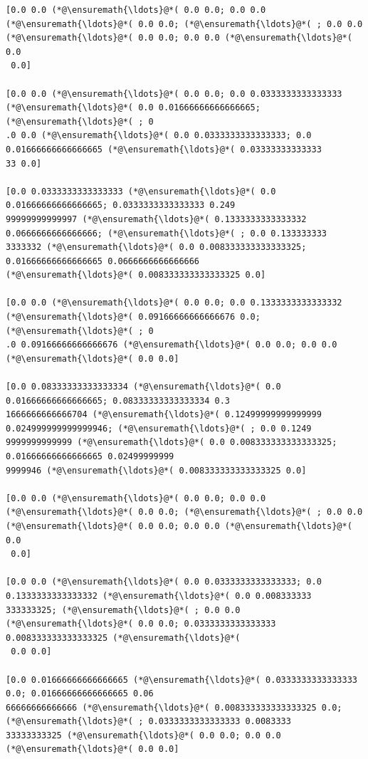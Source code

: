 \documentclass[12pt,a4paper]{article}
\begin{document}
\begin{lstlisting}
[0.0 0.0 (*@\ensuremath{\ldots}@*( 0.0 0.0; 0.0 0.0 (*@\ensuremath{\ldots}@*( 0.0 0.0; (*@\ensuremath{\ldots}@*( ; 0.0 0.0 (*@\ensuremath{\ldots}@*( 0.0 0.0; 0.0 0.0 (*@\ensuremath{\ldots}@*( 0.0
 0.0]

[0.0 0.0 (*@\ensuremath{\ldots}@*( 0.0 0.0; 0.0 0.0333333333333333 (*@\ensuremath{\ldots}@*( 0.0 0.01666666666666665; (*@\ensuremath{\ldots}@*( ; 0
.0 0.0 (*@\ensuremath{\ldots}@*( 0.0 0.0333333333333333; 0.0 0.01666666666666665 (*@\ensuremath{\ldots}@*( 0.03333333333333
33 0.0]

[0.0 0.0333333333333333 (*@\ensuremath{\ldots}@*( 0.0 0.01666666666666665; 0.0333333333333333 0.249
99999999999997 (*@\ensuremath{\ldots}@*( 0.1333333333333332 0.0666666666666666; (*@\ensuremath{\ldots}@*( ; 0.0 0.133333333
3333332 (*@\ensuremath{\ldots}@*( 0.0 0.008333333333333325; 0.01666666666666665 0.0666666666666666 
(*@\ensuremath{\ldots}@*( 0.008333333333333325 0.0]

[0.0 0.0 (*@\ensuremath{\ldots}@*( 0.0 0.0; 0.0 0.1333333333333332 (*@\ensuremath{\ldots}@*( 0.09166666666666676 0.0; (*@\ensuremath{\ldots}@*( ; 0
.0 0.09166666666666676 (*@\ensuremath{\ldots}@*( 0.0 0.0; 0.0 0.0 (*@\ensuremath{\ldots}@*( 0.0 0.0]

[0.0 0.08333333333333334 (*@\ensuremath{\ldots}@*( 0.0 0.01666666666666665; 0.08333333333333334 0.3
1666666666666704 (*@\ensuremath{\ldots}@*( 0.12499999999999999 0.024999999999999946; (*@\ensuremath{\ldots}@*( ; 0.0 0.1249
9999999999999 (*@\ensuremath{\ldots}@*( 0.0 0.008333333333333325; 0.01666666666666665 0.02499999999
9999946 (*@\ensuremath{\ldots}@*( 0.008333333333333325 0.0]

[0.0 0.0 (*@\ensuremath{\ldots}@*( 0.0 0.0; 0.0 0.0 (*@\ensuremath{\ldots}@*( 0.0 0.0; (*@\ensuremath{\ldots}@*( ; 0.0 0.0 (*@\ensuremath{\ldots}@*( 0.0 0.0; 0.0 0.0 (*@\ensuremath{\ldots}@*( 0.0
 0.0]

[0.0 0.0 (*@\ensuremath{\ldots}@*( 0.0 0.0333333333333333; 0.0 0.1333333333333332 (*@\ensuremath{\ldots}@*( 0.0 0.008333333
333333325; (*@\ensuremath{\ldots}@*( ; 0.0 0.0 (*@\ensuremath{\ldots}@*( 0.0 0.0; 0.0333333333333333 0.008333333333333325 (*@\ensuremath{\ldots}@*(
 0.0 0.0]

[0.0 0.01666666666666665 (*@\ensuremath{\ldots}@*( 0.0333333333333333 0.0; 0.01666666666666665 0.06
66666666666666 (*@\ensuremath{\ldots}@*( 0.008333333333333325 0.0; (*@\ensuremath{\ldots}@*( ; 0.0333333333333333 0.0083333
33333333325 (*@\ensuremath{\ldots}@*( 0.0 0.0; 0.0 0.0 (*@\ensuremath{\ldots}@*( 0.0 0.0]


\end{lstlisting}
\end{document}
